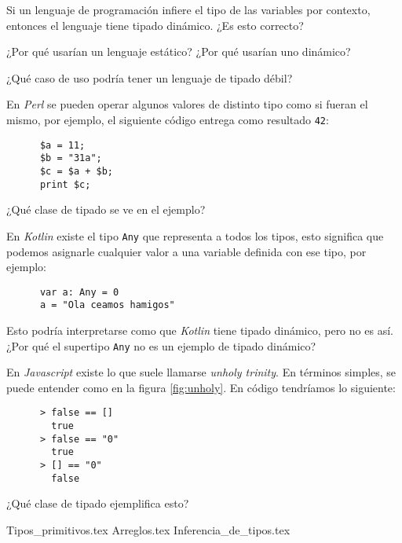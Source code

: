   \begin{exercise}
    Si un lenguaje de programación infiere el tipo de las variables por contexto, entonces el 
    lenguaje tiene tipado dinámico.
    ¿Es esto correcto?
  \end{exercise}

  \begin{exercise}
    ¿Por qué usarían un lenguaje estático?
    ¿Por qué usarían uno dinámico?
  \end{exercise}

  \begin{exercise}
    ¿Qué caso de uso podría tener un lenguaje de tipado débil?
  \end{exercise}

  \begin{exercise}
    En \textit{Perl} se pueden operar algunos valores de distinto tipo como si fueran el mismo,
    por ejemplo, el siguiente código entrega como resultado \texttt{42}:
    \begin{verbatim}
      $a = 11;
      $b = "31a";
      $c = $a + $b;
      print $c;
    \end{verbatim}

    ¿Qué clase de tipado se ve en el ejemplo?
  \end{exercise}
  
  \begin{exercise}
    En \textit{Kotlin} existe el tipo \texttt{Any} que representa a todos los tipos, 
    esto significa que podemos asignarle cualquier valor a una variable definida con ese tipo, por
    ejemplo:

    \begin{verbatim}
      var a: Any = 0
      a = "Ola ceamos hamigos"
    \end{verbatim}

    Esto podría interpretarse como que \textit{Kotlin} tiene tipado dinámico, pero no es así.
    ¿Por qué el supertipo \texttt{Any} no es un ejemplo de tipado dinámico?
  \end{exercise}

  \begin{exercise}
    En \textit{Javascript} existe lo que suele llamarse \textit{unholy trinity}.
    En términos simples, se puede entender como en la figura \ref{fig:unholy}.
    En código tendríamos lo siguiente:
    \begin{verbatim}
      > false == [] 
        true
      > false == "0"
        true
      > [] == "0"
        false
    \end{verbatim}

    ¿Qué clase de tipado ejemplifica esto?
  \end{exercise}


  {Tipos_primitivos.tex}
  {Arreglos.tex}
  {Inferencia_de_tipos.tex}